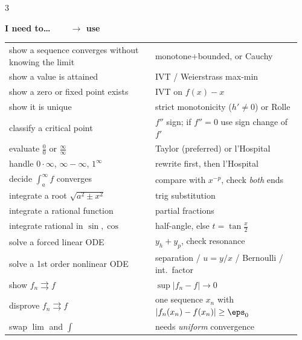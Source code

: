 \begin{multicols}{3}
{\columnbreak

\textbf{\sffamily\color{subText}I need to\ldots\ \ \ \ $\rightarrow$ use}\par\nobreak\vspace{1pt}
\renewcommand{\arraystretch}{1.15}
\begin{tabular}{@{}>{\raggedright\arraybackslash}p{0.48\linewidth}>{\raggedright\arraybackslash}p{0.48\linewidth}@{}}
\midrule
show a sequence converges without knowing the limit & monotone+bounded, or Cauchy \\
show a value is attained & IVT / Weierstrass max-min \\
show a zero or fixed point exists & IVT on $f(x)-x$ \\
show it is unique & strict monotonicity ($h'\ne0$) or Rolle \\
classify a critical point & $f''$ sign; if $f''=0$ use sign change of $f'$ \\
evaluate $\frac00$ or $\frac\infty\infty$ & Taylor (preferred) or l'Hospital \\
handle $0\cdot\infty$, $\infty-\infty$, $1^\infty$ & rewrite first, then l'Hospital \\
decide $\int_a^\infty f$ converges & compare with $x^{-p}$, check \emph{both} ends \\
integrate a root $\sqrt{a^2\pm x^2}$ & trig substitution \\
integrate a rational function & partial fractions \\
integrate rational in $\sin,\cos$ & half-angle, else $t=\tan\frac x2$ \\
solve a forced linear ODE & $y_h+y_p$, check resonance \\
solve a 1st order nonlinear ODE & separation / $u=y/x$ / Bernoulli / int.\ factor \\
show $f_n\rightrightarrows f$ & $\sup|f_n-f|\to0$ \\
disprove $f_n\rightrightarrows f$ & one sequence $x_n$ with $|f_n(x_n)-f(x_n)|\ge\eps_0$ \\
swap $\lim$ and $\int$ & needs \emph{uniform} convergence \\
\end{tabular}

}
\end{multicols}
